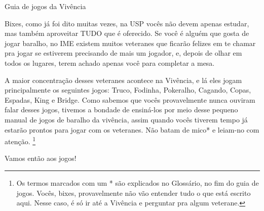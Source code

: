 \begin{secao}{Guia de jogos da Vivência }

Bixes, como já foi dito muitas vezes, na USP vocês não devem apenas estudar, mas
também aproveitar TUDO que é oferecido. Se você é alguém que gosta de jogar
baralho, no IME existem muitos veteranes que ficarão felizes em te chamar pra
jogar se estiverem precisando de mais um jogador, e, depois de olhar em todos
os lugares, terem achado apenas você para completar a mesa.

A maior concentração desses veteranes acontece na Vivência, e lá eles jogam
principalmente os seguintes jogos: Truco, Fodinha, Pokeralho, Cagando, Copas, Espadas,
King e Bridge. Como sabemos que vocês provavelmente nunca ouviram falar desses jogos,
tivemos a bondade de ensiná-los por meio desse pequeno manual de jogos de baralho da
vivência, assim quando vocês tiverem tempo já estarão prontos para jogar com os veteranes.
Não batam de mico* e leiam-no com atenção. \footnote{Os termos marcados com um * são explicados
no Glossário, no fim do guia de jogos. Vocês, bixes, provavelmente não vão entender tudo o que
está escrito aqui. Nesse caso, é só ir até a Vivência e perguntar pra algum veterane.}

Vamos então aos jogos!





\pagebreak

\pagebreak

\pagebreak




\end{secao}
